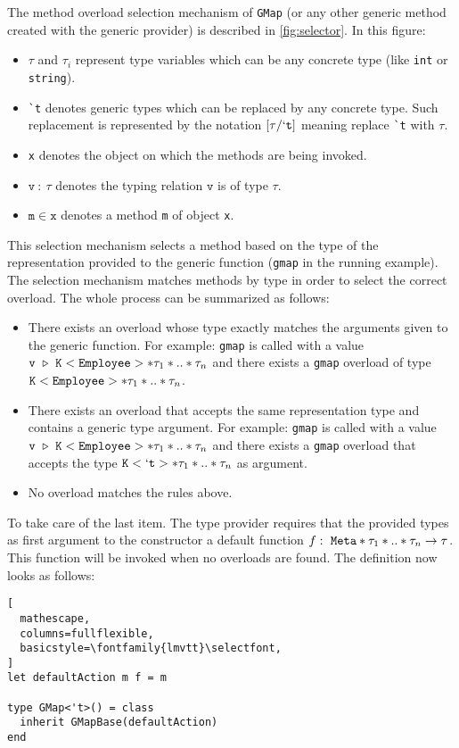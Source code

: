 \documentclass{sigplanconf}
\begin{document}
The method overload selection mechanism of \verb+GMap+ (or any other
generic method created with the generic provider) is described in
\ref{fig:selector}. In this figure:
\begin{itemize}
\item $\tau$ and $\tau_i$ represent type variables which can be any
  concrete type (like \verb+int+ or \verb+string+).
\item \verb+`t+ denotes generic types which can be replaced by any
  concrete type. Such replacement is represented by the notation
  $[\tau/\mathtt{`t}]$ meaning replace \verb=`t= with $\tau$.
\item \verb+x+ denotes the object on which the methods are being invoked.
\item $\mathtt{v}\ :\ \tau$ denotes the typing relation $\mathtt{v}$ is of type $\tau$.
\item $\mathtt{m}\in\mathtt{x}$ denotes a method \verb+m+ of object \verb+x+.
\end{itemize}
This selection mechanism selects a method based on the type of the
representation provided to the generic function (\verb+gmap+ in the
running example). The selection mechanism matches methods by type in
order to select the correct overload. The whole process can be
summarized as follows:
\begin{itemize}
\item There exists an overload whose type exactly matches the
  arguments given to the generic function. For example: \verb+gmap+ is
  called with a value $\mathtt{v}\ \triangleright\
  \mathtt{K}<\mathtt{Employee}>*\tau_1*..*\tau_n$ and there exists a
  \verb+gmap+ overload of type
  $\mathtt{K}<\mathtt{Employee}>*\tau_1*..*\tau_n$.
\item There exists an overload that accepts the same representation
  type and contains a generic type argument. For example: \verb+gmap+
  is called with a value $\mathtt{v}\ \triangleright\
  \mathtt{K}<\mathtt{Employee}>*\tau_1*..*\tau_n$ and there exists a
  \verb+gmap+ overload that accepts the type $\mathtt{K}<\mathtt{`t}>*\tau_1*..*\tau_n$
  as argument.
\item No overload matches the rules above.
\end{itemize}
To take care of the last item. The type provider requires that the
provided types as first argument to the constructor a default function
$f:\ \mathtt{Meta}*\tau_1*..*\tau_n\rightarrow \tau$. This function will be invoked when no
overloads are found. The definition now looks as follows:
\begin{lstlisting}[
  mathescape,
  columns=fullflexible,
  basicstyle=\fontfamily{lmvtt}\selectfont,
]
let defaultAction m f = m

type GMap<'t>() = class
  inherit GMapBase(defaultAction)
end
\end{lstlisting}
\end{document}
